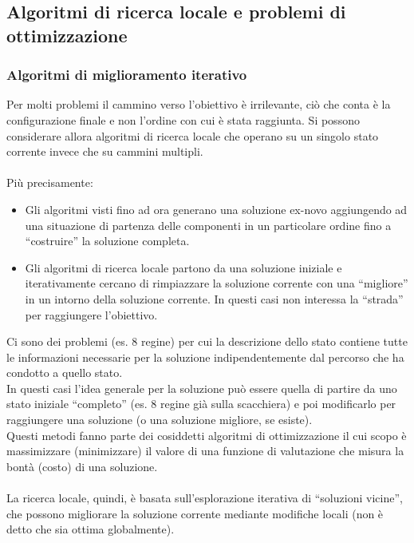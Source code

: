 \documentclass[../main.tex]{subfiles}
\begin{document}
	\subsection{Algoritmi di ricerca locale e problemi di ottimizzazione}
	\subsubsection{Algoritmi di miglioramento iterativo}
	Per molti problemi il cammino verso l’obiettivo è irrilevante, ciò che conta è la configurazione finale e non l’ordine con cui è stata raggiunta. Si possono considerare allora algoritmi di ricerca locale che operano su un singolo stato corrente invece che su cammini multipli.\\\\
	Più precisamente:
	\begin{itemize}
		\item Gli algoritmi visti fino ad ora generano una soluzione ex-novo aggiungendo ad una situazione di partenza delle componenti in un particolare ordine fino a “costruire” la soluzione completa.
		\item Gli algoritmi di ricerca locale partono da una soluzione iniziale e iterativamente cercano di rimpiazzare la soluzione corrente con una “migliore” in un intorno della soluzione corrente. In questi casi non interessa la “strada” per raggiungere l’obiettivo.
	\end{itemize}
	Ci sono dei problemi (es. 8 regine) per cui la descrizione dello stato contiene tutte le informazioni necessarie per la soluzione indipendentemente dal percorso che ha condotto a quello stato.\\
	In questi casi l’idea generale per la soluzione può essere quella di partire da uno stato iniziale “completo” (es. 8 regine già sulla scacchiera) e poi modificarlo per raggiungere una soluzione (o una soluzione migliore, se esiste). \\
	Questi metodi fanno parte dei cosiddetti algoritmi di ottimizzazione il cui scopo è massimizzare (minimizzare) il valore di una funzione di valutazione che misura la bontà (costo) di una soluzione.\\\\
	La ricerca locale, quindi, è basata sull’esplorazione iterativa di “soluzioni vicine”, che possono migliorare la soluzione corrente mediante modifiche locali (non è detto che sia ottima globalmente).
\end{document}
